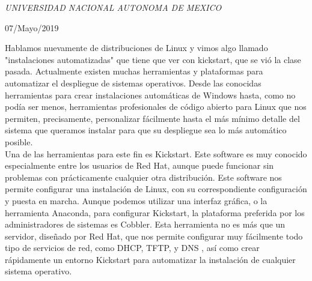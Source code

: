 \documentclass[a4paper, 11pt, oneside]{article}
\begin{document}
\begin{titlepage}
	\textit{UNIVERSIDAD NACIONAL AUTONOMA DE MEXICO} 
	
	\vfill
	
	
	
	
	\vspace{0.3\baselineskip} 
	
	07/Mayo/2019 
	
	

\end{titlepage}
Hablamos nuevamente de distribuciones de Linux y vimos algo llamado "instalaciones automatizadas" que tiene que ver con kickstart, que se vió la clase pasada. Actualmente existen muchas herramientas y plataformas para automatizar el despliegue de sistemas operativos. Desde las conocidas herramientas para crear instalaciones automáticas de Windows hasta, como no podía ser menos, herramientas profesionales de código abierto para Linux que nos permiten, precisamente, personalizar fácilmente hasta el más mínimo detalle del sistema que queramos instalar para que su despliegue sea lo más automático posible.\\
Una de las herramientas para este fin es Kickstart. Este software es muy conocido especialmente entre los usuarios de Red Hat, aunque puede funcionar sin problemas con prácticamente cualquier otra distribución. Este software nos permite configurar una instalación de Linux, con su correspondiente configuración y puesta en marcha. Aunque podemos utilizar una interfaz gráfica, o la herramienta Anaconda, para configurar Kickstart, la plataforma preferida por los administradores de sistemas es Cobbler. Esta herramienta no es más que un servidor, diseñado por Red Hat, que nos permite configurar muy fácilmente todo tipo de servicios de red, como DHCP, TFTP, y DNS , así como crear rápidamente un entorno Kickstart para automatizar la instalación de cualquier sistema operativo.
\end{document}
